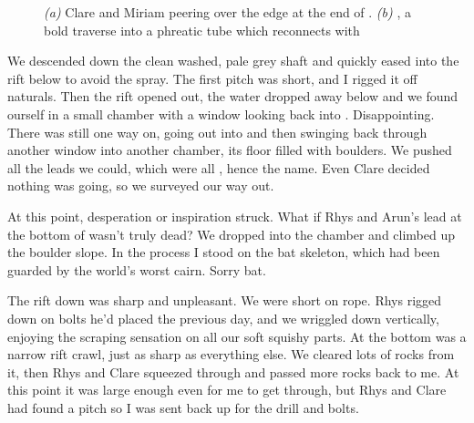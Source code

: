  \begin{figure}[t!]
\checkoddpage \ifoddpage \forcerectofloat \else \forceversofloat \fi
   \centering
     \begin{subfigure}[t]{0.627\textwidth}
        \centering
        \caption{} \label{Top of Upside Down}
    \end{subfigure}
    \hfill
         \begin{subfigure}[t]{0.353\textwidth}
        \centering
        \caption{} \label{Rhys on traverse}
    \end{subfigure}
    \caption{
    \emph{(a)} Clare and Miriam peering over the edge at the end of \protect{}. 
    \emph{(b)} \protect{}, a bold traverse into a phreatic tube which reconnects with \protect{} }
\end{figure}
 
 
We descended down the clean washed, pale grey shaft and quickly eased into the rift below to avoid the spray. The first pitch was short, and I rigged it off naturals. Then the rift opened out, the water dropped away below and we found ourself in a small chamber with a window looking back into . Disappointing. There was still one way on, going out into  and then swinging back through another window into another chamber, its floor filled with boulders. We pushed all the leads we could, which were all , hence the name. Even Clare decided nothing was going, so we surveyed our way out.
 
At this point, desperation or inspiration struck. What if Rhys and Arun's lead at the bottom of  wasn't truly dead? We dropped into the chamber and climbed up the boulder slope. In the process I stood on the bat skeleton, which had been guarded by the world's worst cairn. Sorry bat.
 
The rift down was sharp and unpleasant. We were short on rope. Rhys rigged down on bolts he'd placed the previous day, and we wriggled down vertically, enjoying the scraping sensation on all our soft squishy parts. At the bottom was a narrow rift crawl, just as sharp as everything else. We cleared lots of rocks from it, then Rhys and Clare squeezed through and passed more rocks back to me. At this point it was large enough even for me to get through, but Rhys and Clare had found a pitch so I was sent back up for the drill and bolts.
 
